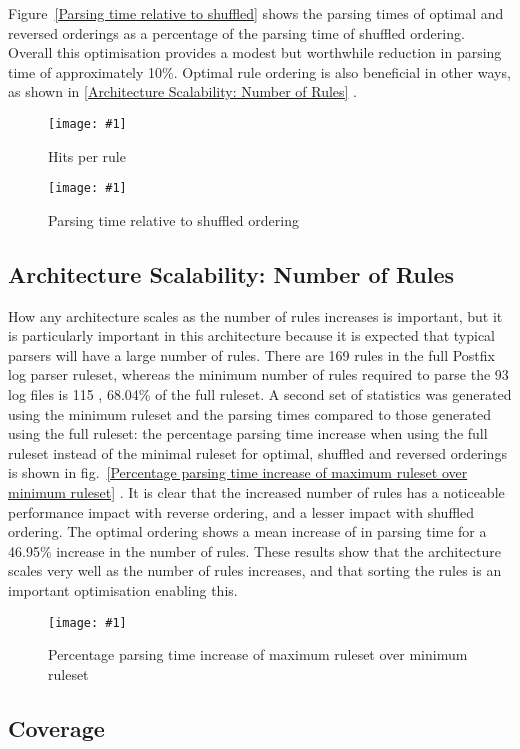 \documentclass[draft]{svmult}
\newcommand{\showgraph}[3]{%
    \begin{figure}[btp]%
        \texttt{[image: \#1]}%
        \caption{#2}\label{#3}%
    \end{figure}%
}
\newcommand{\sectionref}[1]{%
    \textsection{}\vref*{#1}%
}
\newcommand{\refwithlabel}[2]{%
    #1~\vref{#2}%
}
\newcommand{\graphref}[1]{%
    \refwithlabel{fig.}{#1}%
}
\newcommand{\Graphref}[1]{%
    \refwithlabel{Figure}{#1}%
}
\newcommand{\numberOFlogFILES}[0]{%
    93%
}
\newcommand{\numberOFrules}[0]{%
    169%
}
\newcommand{\numberOFrulesMINIMUM}[0]{%
    115%
}
\newcommand{\numberOFrulesMINIMUMpercentage}[0]{%
    68.04\%%
}
\newcommand{\numberOFrulesMAXIMUMpercentage}[0]{%
    46.95\%%
}
\begin{document}
\Graphref{Parsing time relative to shuffled} shows the parsing times of
optimal and reversed orderings as a percentage of the parsing time of
shuffled ordering.  Overall this optimisation provides a modest but
worthwhile reduction in parsing time of approximately 10\%.  Optimal rule
ordering is also beneficial in other ways, as shown in
\sectionref{Architecture Scalability: Number of Rules}.
\showgraph{build/graph-hits}{Hits per rule}{rule hits graph}
\showgraph{build/graph-optimal-and-reverse-vs-shuffle}{Parsing time
relative to shuffled ordering}{Parsing time relative to shuffled}

\subsection{Architecture Scalability: Number of Rules}

\label{Architecture Scalability: Number of Rules}

How any architecture scales as the number of rules increases is important,
but it is particularly important in this architecture because it is
expected that typical parsers will have a large number of rules.  There are
\numberOFrules{} rules in the full Postfix log parser ruleset, whereas the
minimum number of rules required to parse the \numberOFlogFILES{} log files
is \numberOFrulesMINIMUM{}, \numberOFrulesMINIMUMpercentage{} of the full
ruleset.  A second set of statistics was generated using the minimum
ruleset and the parsing times compared to those generated using the full
ruleset: the percentage parsing time increase when using the full ruleset
instead of the minimal ruleset for optimal, shuffled and reversed orderings
is shown in \graphref{Percentage parsing time increase of maximum ruleset
over minimum ruleset}.  It is clear that the increased number of rules has
a noticeable performance impact with reverse ordering, and a lesser impact
with shuffled ordering.  The optimal ordering shows a mean increase of
 in parsing time for a
\numberOFrulesMAXIMUMpercentage{} increase in the number of rules.  These
results show that the architecture scales very well as the number of rules
increases, and that sorting the rules is an important optimisation enabling
this.  \showgraph{build/graph-full-ruleset-vs-minimum-ruleset}{Percentage
parsing time increase of maximum ruleset over minimum ruleset}{Percentage
parsing time increase of maximum ruleset over minimum ruleset}

\subsection{Coverage}
\end{document}
